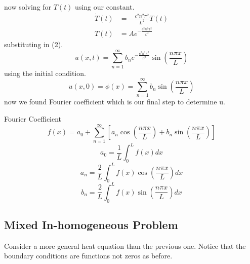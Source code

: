 \documentclass[]{article}
\begin{document}
now solving for $T(t)$ using our constant.
\begin{align*}
\dot{T}(t) &= -\frac{c^2 n^2 \pi^2}{L^2} T(t)
\\
T(t) &= Ae^{-\frac{c^2 n^2 \pi^2}{L^2}}
\end{align*}
substituting in (2).
\[
    u(x,t) = \sum_{n=1}^{\infty} b_n e^{-\frac{c^2 n^2 \pi^2}{L^2}}\sin\left(\frac{n\pi x}{L}\right)    
\]
using the initial condition.
\[
    u(x,0) = \phi(x) = \sum_{n=1}^{\infty} b_n \sin\left(\frac{n\pi x}{L}\right)    
\]
now we found Fourier coefficient which is our final step to determine u.
\begin{enrichment*}{Fourier Coefficient}
    \[
        f(x) = a_0  + \sum_{n=1}^{\infty}\left[a_n \cos\left(\frac{n\pi x}{L}\right) + b_n \sin\left(\frac{n\pi x}{L}\right) \right]
    \]
    \[
        a_0 = \frac{1}{L}\int_{0}^{L}f(x)dx
    \]
    \[
        a_n = \frac{2}{L}\int_{0}^{L}f(x)\cos\left(\frac{n\pi x}{L}\right)dx
    \]
    \[
        b_n = \frac{2}{L}\int_{0}^{L}f(x)\sin\left(\frac{n\pi x}{L}\right)dx
    \]
\end{enrichment*}

\setcounter{equation}{0}
\subsection{Mixed In-homogeneous Problem}

Consider a more general heat equation than the previous one. Notice that the boundary conditions are functions not zeros as before.
\end{document}

